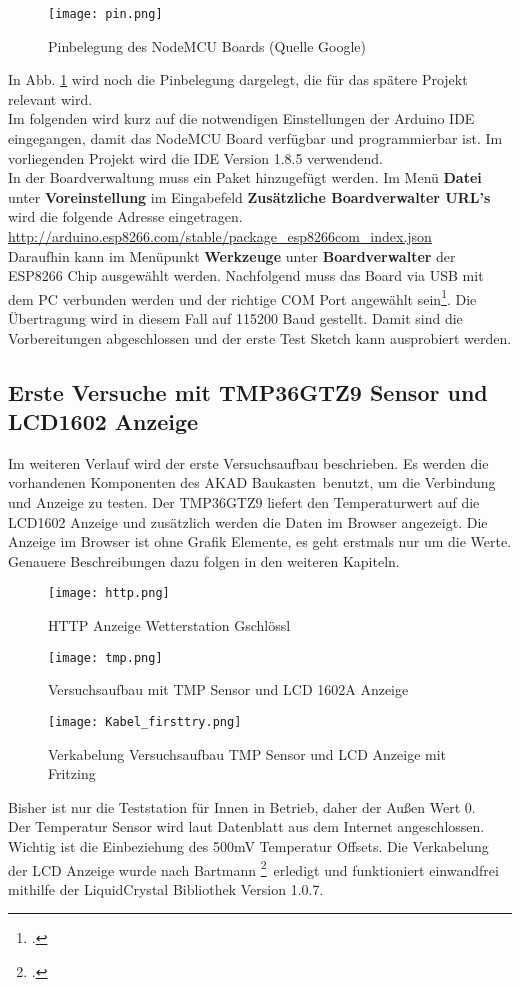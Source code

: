 \documentclass[12pt,a4paper]{scrartcl}	%
\begin{document}
\begin{figure}[htb]
	\centering
	\texttt{[image: pin.png]}
	\caption{Pinbelegung des NodeMCU Boards (Quelle Google)}
	\label{pin}
\end{figure}
In Abb. \ref{pin} wird noch die Pinbelegung dargelegt, die für das spätere Projekt relevant wird.\\
Im folgenden wird kurz auf die notwendigen Einstellungen der Arduino IDE eingegangen, damit das NodeMCU Board verfügbar und programmierbar ist. Im vorliegenden Projekt wird die IDE Version 1.8.5 verwendend.\\
In der Boardverwaltung muss ein Paket hinzugefügt werden. Im Menü \textbf{Datei} unter \textbf{Voreinstellung} im Eingabefeld \textbf{Zusätzliche Boardverwalter URL's} wird die folgende Adresse eingetragen.\\
\url{http://arduino.esp8266.com/stable/package_esp8266com_index.json}\\
Daraufhin kann im Menüpunkt \textbf{Werkzeuge} unter \textbf{Boardverwalter} der ESP8266 Chip ausgewählt werden. Nachfolgend muss das Board via USB mit dem PC verbunden werden und der richtige COM Port angewählt sein\footcite[vgl.][Abruf am 07.07.2018]{node}. Die Übertragung wird in diesem Fall auf 115200 Baud gestellt. Damit sind die Vorbereitungen abgeschlossen und der erste Test Sketch kann ausprobiert werden.
\subsection{Erste Versuche mit TMP36GTZ9 Sensor und LCD1602 Anzeige}
Im weiteren Verlauf wird der erste Versuchsaufbau beschrieben. Es werden die vorhandenen Komponenten des \glqq AKAD Baukasten\grqq~benutzt, um die Verbindung und Anzeige zu testen. Der TMP36GTZ9 liefert den Temperaturwert auf die LCD1602 Anzeige und zusätzlich werden die Daten im Browser angezeigt. Die Anzeige im Browser ist ohne Grafik Elemente, es geht erstmals nur um die Werte. Genauere Beschreibungen dazu folgen in den weiteren Kapiteln.
\begin{figure}[htb]
	\centering
	\texttt{[image: http.png]}
	\caption{HTTP Anzeige Wetterstation Gschlössl}
\end{figure}
\begin{figure}[htb]
	\centering
	\texttt{[image: tmp.png]}
	\caption{Versuchsaufbau mit TMP Sensor und LCD  1602A Anzeige}
\end{figure}
\begin{figure}[htb]
	\centering
	\texttt{[image: Kabel\_firsttry.png]}
	\caption{Verkabelung Versuchsaufbau TMP Sensor und LCD Anzeige mit Fritzing}
\end{figure}
Bisher ist nur die Teststation für Innen in Betrieb, daher der Außen Wert 0.\\
Der Temperatur Sensor wird laut Datenblatt aus dem Internet angeschlossen. Wichtig ist die Einbeziehung des 500mV Temperatur Offsets. Die Verkabelung der LCD Anzeige wurde nach \glqq Bartmann \footcite{Bart}\grqq~erledigt und funktioniert einwandfrei mithilfe der LiquidCrystal Bibliothek Version 1.0.7.
\end{document}
